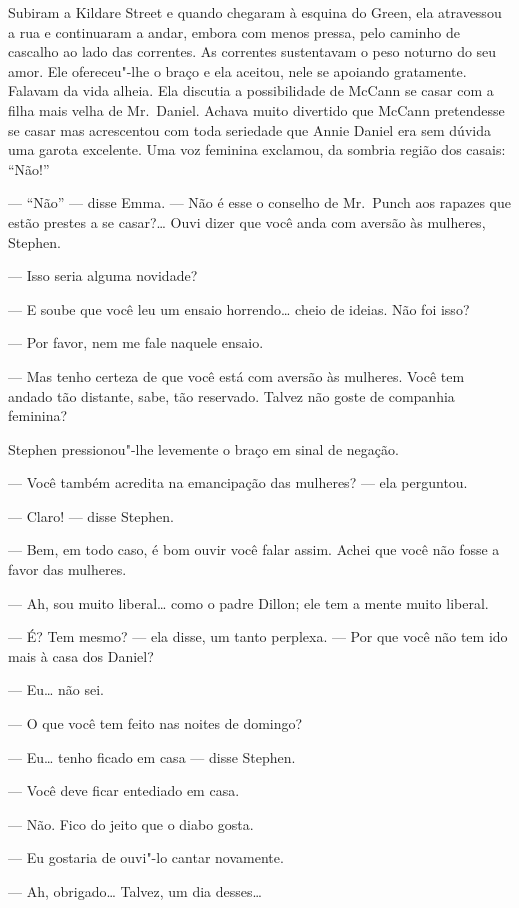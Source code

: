 Subiram a Kildare Street e quando chegaram à esquina do Green, ela atravessou a
rua e continuaram a andar, embora com menos pressa, pelo \label{caminho"-de} caminho de cascalho
ao lado das correntes.  As correntes sustentavam o peso noturno do seu amor.  
Ele ofereceu"-lhe o braço e ela aceitou, nele se apoiando		
gratamente.  Falavam da vida alheia.  Ela discutia a possibilidade de McCann se
casar com a filha mais velha de Mr.~Daniel.  Achava muito divertido que McCann
pretendesse se casar mas acrescentou com toda seriedade que Annie Daniel era
sem dúvida uma garota excelente.  Uma voz feminina exclamou, da sombria região
dos casais: “Não!”

--- “Não” --- disse Emma.  --- Não é esse o conselho de Mr.~Punch aos rapazes
que estão prestes a se casar?\ldots{}  Ouvi dizer que você anda com aversão às
mulheres, Stephen.

--- Isso seria alguma novidade?

--- E soube que você leu um ensaio horrendo\ldots{} cheio de ideias.  Não foi isso?

--- Por favor, nem me fale naquele ensaio.

--- Mas tenho certeza de que você está com aversão às mulheres.  Você tem
andado tão distante, sabe, tão reservado.  Talvez não goste de companhia
feminina?

Stephen pressionou"-lhe levemente o braço em sinal de negação.

--- Você também acredita na emancipação das mulheres? --- ela perguntou.

--- Claro! --- disse Stephen.

--- Bem, em todo caso, é bom ouvir você falar assim.  Achei que você não fosse
a favor das mulheres.

--- Ah, sou muito liberal\ldots{} como o padre Dillon; ele tem a mente muito
liberal.

--- É?  Tem mesmo? --- ela disse, um tanto perplexa.  --- Por que você não tem
ido mais à casa dos Daniel?

--- Eu\ldots{} não sei.

--- O que você tem feito nas noites de domingo?

--- Eu\ldots{} tenho ficado em casa --- disse Stephen.

--- Você deve ficar entediado em casa.

--- Não.  Fico do jeito que o diabo gosta.

--- Eu gostaria de ouvi"-lo cantar novamente.

--- Ah, obrigado\ldots{}  Talvez, um dia desses\ldots{}

